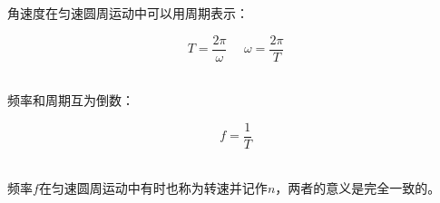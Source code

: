 \documentclass[UTF8]{ctexart}
\begin{document}
    角速度在匀速圆周运动中可以用周期表示：
    \begin{large}
        \begin{equation*}
            T=\frac{2\pi}{\omega}~~~~~~\omega=\frac{2\pi}{T}
        \end{equation*}
    \end{large}\\
    频率和周期互为倒数：
    \begin{large}
        \begin{equation*}
            f=\frac{1}{T}
        \end{equation*}
    \end{large}\\
    频率$f$在匀速圆周运动中有时也称为转速并记作$n$，两者的意义是完全一致的。

\newpage
\end{document}

